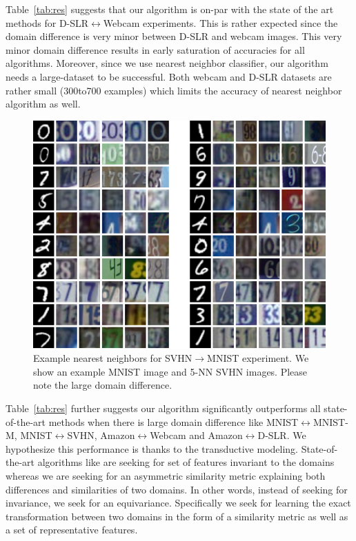 Table~\ref{tab:res} suggests that our algorithm is on-par with the state of the art methods for D-SLR$\leftrightarrow$Webcam experiments. This is rather expected since the domain difference is very minor between D-SLR and webcam images. This very minor domain difference results in early saturation of accuracies for all algorithms. Moreover, since we use nearest neighbor classifier, our algorithm needs a large-dataset to be successful. Both webcam and D-SLR datasets are rather small (300to700 examples) which limits the accuracy of nearest neighbor algorithm as well.

\begin{figure}[ht]
\includegraphics[width=\columnwidth]{digit_nn.png}
\caption{Example nearest neighbors for SVHN$\rightarrow$MNIST experiment. We show an example MNIST image and 5-NN SVHN images. Please note the large domain difference.}
\label{fig:nn}
\end{figure}

Table~\ref{tab:res} further suggests our algorithm significantly outperforms all state-of-the-art methods when there is large domain difference like MNIST$\leftrightarrow$MNIST-M, MNIST$\leftrightarrow$SVHN, Amazon$\leftrightarrow$Webcam and Amazon$\leftrightarrow$D-SLR. We hypothesize this performance is thanks to the transductive modeling. State-of-the-art algorithms like \cite{ganin15} are seeking for set of features invariant to the domains whereas we are seeking for an asymmetric similarity metric explaining both differences and similarities of two domains. In other words, instead of seeking for invariance, we seek for an equivariance. Specifically we seek for learning the exact transformation between two domains in the form of a similarity metric as well as a set of representative features.

